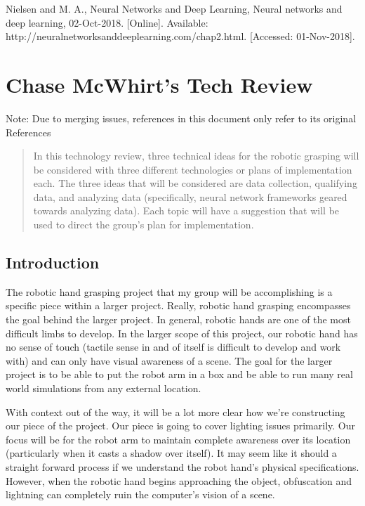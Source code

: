 \documentclass[10pt,journal,compsoc, draftclsnofoot,onecolumn]{IEEEtran}
\begin{document}
\noindent
[3]	Nielsen and M. A., Neural Networks and Deep Learning, Neural networks and deep learning, 02-Oct-2018. [Online]. Available:
http://neuralnetworksanddeeplearning.com/chap2.html. [Accessed: 01-Nov-2018].



\newpage
\section{Chase McWhirt's Tech Review}
Note: Due to merging issues, references in this document only refer to its original References
\begin{abstract}
In this technology review, three technical ideas for the robotic grasping will be considered with three different technologies or plans of implementation each.
The three ideas that will be considered are data collection, qualifying data, and analyzing data (specifically, neural network frameworks geared towards analyzing data).
Each topic will have a suggestion that will be used to direct the group's plan for implementation.
\end{abstract}

\subsection{Introduction}
The robotic hand grasping project that my group will be accomplishing is a specific piece within a larger project.
Really, robotic hand grasping encompasses the goal behind the larger project.
In general, robotic hands are one of the most difficult limbs to develop.
In the larger scope of this project, our robotic hand has no sense of touch (tactile sense in and of itself is difficult to develop and work with) and can only have visual awareness of a scene.
The goal for the larger project is to be able to put the robot arm in a box and be able to run many real world simulations from any external location.

With context out of the way, it will be a lot more clear how we're constructing our piece of the project.
Our piece is going to cover lighting issues primarily.
Our focus will be for the robot arm to maintain complete awareness over its location (particularly when it casts a shadow over itself).
It may seem like it should a straight forward process if we understand the robot hand's physical specifications.
However, when the robotic hand begins approaching the object, obfuscation and lightning can completely ruin the computer's vision of a scene.
\end{document}
